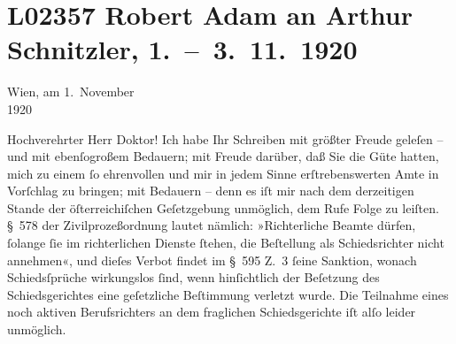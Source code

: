 

\section[Robert Adam an Arthur Schnitzler, 1. – 3. 11. 1920]{L02357 Robert Adam an Arthur Schnitzler, 1. – 3. 11. 1920}
\nopagebreak{}
\rehead{ }\normalsize\beginnumbering{}
\toendnotes[C]{\smallbreak\pagebreak[2]}
\toendnotes[C]{\smallbreak}
\pstart
           \raggedleft{}{\pb}Wien, am 1. November{\\}1920\pend
           
\pstart\center{}Hochverehrter Herr Doktor!\pend\vspace{0.5em}
\pstart
           Ich habe Ihr Schreiben mit größter Freude geleſen – und mit ebenſogroßem Bedauern;
               mit Freude darüber, daß Sie die Güte hatten, mich zu einem ſo ehrenvollen und mir in
               jedem Sinne erſtrebenswerten Amte in Vorſchlag zu bringen; mit Bedauern – denn es iſt
               mir nach dem derzeitigen Stande der öſterreichiſchen Geſetzgebung unmöglich, dem Rufe
               Folge zu leiſten. § 578 der Zivilprozeßordnung lautet nämlich: »Richterliche Beamte
               dürfen, ſolange ſie im richterlichen Dienste ſtehen, die Beſtellung als
               Schiedsrichter nicht annehmen«, und dieſes Verbot findet im § 595 Z. 3 ſeine
               Sanktion, wonach Schiedsſprüche wirkungs{\pb}los ſind, wenn hinſichtlich der Beſetzung des Schiedsgerichtes eine geſetzliche
               Beſtimmung verletzt wurde. Die Teilnahme eines noch aktiven Berufsrichters an dem
               fraglichen Schiedsgerichte iſt alſo leider unmöglich.\pend
           

